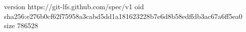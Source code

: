version https://git-lfs.github.com/spec/v1
oid sha256:e276b0cf62f75958a3cabd5dd1a181623228b7e6d8b58edffdb3ac67a6ff5ea0
size 786528
